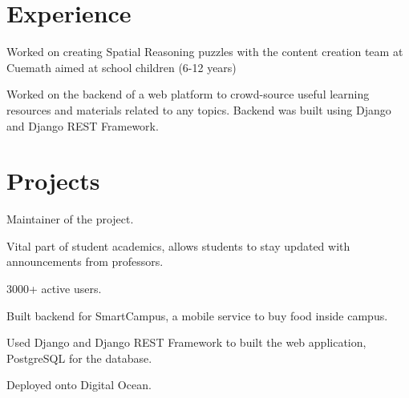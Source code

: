 \documentclass[]{abhijeet_viswa-deedy-resume-openfont}
\begin{document}
\hfill
\begin{minipage}[t]{0.70\textwidth}

\section{Experience}
\subsectionsep
\subsectionsep

\subsectionsep %
\begin{tightemize}
\item Worked on creating Spatial Reasoning puzzles with the content creation team at Cuemath aimed at school children (6-12 years)
\item Worked on the backend of a web platform to crowd-source useful learning resources and materials related to any topics.
Backend was built using Django and Django REST Framework.
\end{tightemize}
\primarysectionsep  %

\section{Projects}
\begin{tightemize}
\item Maintainer of the project.
\item Vital part of student academics, allows students to stay updated with announcements from professors.
\item 3000+ active users.
\end{tightemize}
\subsectionsep

\begin{tightemize}
 \item Built backend for SmartCampus, a mobile service to buy food inside campus.
 \item Used Django and Django REST Framework to built the web application, PostgreSQL for the database.
 \item Deployed onto Digital Ocean.
\end{tightemize}
\primarysectionsep  %


\end{minipage}
\end{document}
